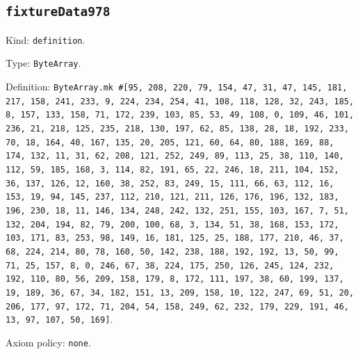\documentclass[11pt]{article}
\begin{document}
\subsection*{\texttt{fixtureData978}}
\noindent Kind: \texttt{definition}.\par
\noindent Type: \texttt{ByteArray}.\par
\noindent Definition: \texttt{ByteArray.mk \#[95, 208, 220, 79, 154, 47, 31, 47, 145, 181, 217, 158, 241, 233, 9, 224, 234, 254, 41, 108, 118, 128, 32, 243, 185, 8, 157, 133, 158, 71, 172, 239, 103, 85, 53, 49, 108, 0, 109, 46, 101, 236, 21, 218, 125, 235, 218, 130, 197, 62, 85, 138, 28, 18, 192, 233, 70, 18, 164, 40, 167, 135, 20, 205, 121, 60, 64, 80, 188, 169, 88, 174, 132, 11, 31, 62, 208, 121, 252, 249, 89, 113, 25, 38, 110, 140, 112, 59, 185, 168, 3, 114, 82, 191, 65, 22, 246, 18, 211, 104, 152, 36, 137, 126, 12, 160, 38, 252, 83, 249, 15, 111, 66, 63, 112, 16, 153, 19, 94, 145, 237, 112, 210, 121, 211, 126, 176, 196, 132, 183, 196, 230, 18, 11, 146, 134, 248, 242, 132, 251, 155, 103, 167, 7, 51, 132, 204, 194, 82, 79, 200, 100, 68, 3, 134, 51, 38, 168, 153, 172, 103, 171, 83, 253, 98, 149, 16, 181, 125, 25, 188, 177, 210, 46, 37, 68, 224, 214, 80, 78, 160, 50, 142, 238, 188, 192, 192, 13, 50, 99, 71, 25, 157, 8, 0, 246, 67, 38, 224, 175, 250, 126, 245, 124, 232, 192, 110, 80, 56, 209, 158, 179, 8, 172, 111, 197, 38, 60, 199, 137, 19, 189, 36, 67, 34, 182, 151, 13, 209, 158, 10, 122, 247, 69, 51, 20, 206, 177, 97, 172, 71, 204, 54, 158, 249, 62, 232, 179, 229, 191, 46, 13, 97, 107, 50, 169]}.\par
\noindent Axiom policy: \texttt{none}.\par
\end{document}
